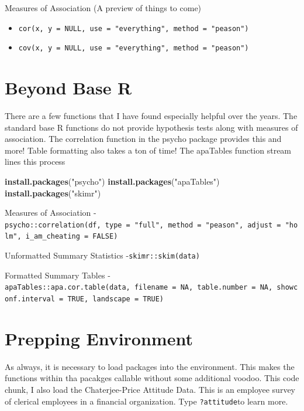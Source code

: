 \documentclass[]{book}
\newenvironment{Shaded}{\begin{snugshade}}{\end{snugshade}}
\newcommand{\KeywordTok}[1]{\textcolor[rgb]{0.13,0.29,0.53}{\textbf{#1}}}
\newcommand{\NormalTok}[1]{#1}
\newcommand{\StringTok}[1]{\textcolor[rgb]{0.31,0.60,0.02}{#1}}
\providecommand{\tightlist}{%
  \setlength{\itemsep}{0pt}\setlength{\parskip}{0pt}}
\theoremstyle{definition}
\theoremstyle{definition}
\theoremstyle{definition}
\theoremstyle{remark}
\begin{document}
Measures of Association (A preview of things to come)

\begin{itemize}
\tightlist
\item
  \texttt{cor(x,\ y\ =\ NULL,\ use\ =\ "everything",\ method\ =\ "peason")}
\item
  \texttt{cov(x,\ y\ =\ NULL,\ use\ =\ "everything",\ method\ =\ "peason")}
\end{itemize}

\hypertarget{beyond-base-r}{%
\section{Beyond Base R}\label{beyond-base-r}}

There are a few functions that I have found especially helpful over the years. The standard base R functions do not provide hypothesis tests along with measures of association. The correlation function in the psycho package provides this and more! Table formatting also takes a ton of time! The apaTables function stream lines this process

\begin{Shaded}
\begin{Highlighting}[]
\KeywordTok{install.packages}\NormalTok{(}\StringTok{"psycho"}\NormalTok{)}
\KeywordTok{install.packages}\NormalTok{(}\StringTok{"apaTables"}\NormalTok{)}
\KeywordTok{install.packages}\NormalTok{(}\StringTok{"skimr"}\NormalTok{)}
\end{Highlighting}
\end{Shaded}

Measures of Association
- \texttt{psycho::correlation(df,\ type\ =\ "full",\ method\ =\ "peason",\ adjust\ =\ "holm",\ i\_am\_cheating\ =\ FALSE)}

Unformatted Summary Statistics
-\texttt{skimr::skim(data)}

Formatted Summary Tables
- \texttt{apaTables::apa.cor.table(data,\ filename\ =\ NA,\ table.number\ =\ NA,\ showconf.interval\ =\ TRUE,\ landscape\ =\ TRUE)}

\hypertarget{prepping-environment}{%
\section{Prepping Environment}\label{prepping-environment}}

As always, it is necessary to load packages into the environment. This makes the functions within tha pacakges callable without some additional voodoo. This code chunk, I also load the Chaterjee-Price Attitude Data. This is an employee survey of clerical employees in a financial organization. Type \texttt{?attitude}to learn more.
\end{document}
